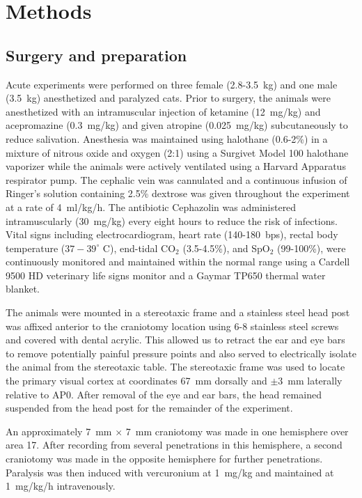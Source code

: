 \section{Methods}

\subsection{Surgery and preparation}
\label{sec:surgery}

Acute experiments were performed on three female (2.8-3.5~kg) and one
male (3.5~kg) anesthetized and paralyzed cats. Prior to surgery, the
animals were anesthetized with an intramuscular injection of ketamine
(12~mg/kg) and acepromazine (0.3~mg/kg) and given atropine
(0.025~mg/kg) subcutaneously to reduce salivation.  Anesthesia was
maintained using halothane (0.6-2\%) in a mixture of nitrous oxide and
oxygen (2:1) using a Surgivet Model 100 halothane vaporizer while the
animals were actively ventilated using a Harvard Apparatus respirator
pump. The cephalic vein was cannulated and a continuous infusion of
Ringer's solution containing 2.5\% dextrose was given throughout the
experiment at a rate of 4~ml/kg/h.
The antibiotic Cephazolin was administered intramuscularly (30~mg/kg)
every eight hours to reduce the risk of infections. Vital signs
including electrocardiogram, heart rate (140-180~bps), rectal body
temperature ($37-39^\circ$ C), end-tidal CO$_2$ (3.5-4.5\%), and
SpO$_2$ (99-100\%), were continuously monitored and maintained within
the normal range using a Cardell 9500 HD veterinary life signs monitor
and a Gaymar TP650 thermal water blanket.

The animals were mounted in a stereotaxic frame and a stainless steel
head post was affixed anterior to the craniotomy location using 6-8
stainless steel screws and covered with dental acrylic. This allowed
us to retract the ear and eye bars to remove potentially painful
pressure points and also served to electrically isolate the animal
from the stereotaxic table. The stereotaxic frame was used to locate
the primary visual cortex at coordinates 67~mm dorsally and $\pm 3$~mm
laterally relative to AP0. After removal of the
eye and ear bars, the head remained suspended from the head post for the
remainder of the experiment.

An approximately 7~mm $\times$ 7~mm craniotomy was made in one
hemisphere over area 17. After recording from several penetrations in
this hemisphere, a second craniotomy was made in the opposite
hemisphere for further penetrations. Paralysis was then induced with
vercuronium at 1~mg/kg and maintained at 1~mg/kg/h intravenously.

